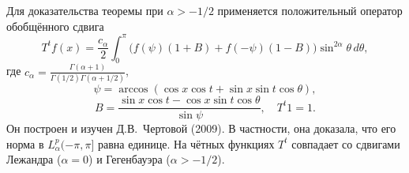 Для доказательства теоремы при $\alpha>-1/2$ применяется положительный оператор
обобщённого сдвига
\[
T^{t}f(x)=\frac{c_{\alpha}}{2}\int_{0}^{\pi}\bigl(f(\psi)(1+B)+
f(-\psi)(1-B)\bigr)\sin^{2\alpha}\theta\,d\theta,
\]
где $c_{\alpha}=\frac{\Gamma(\alpha+1)}{\Gamma(1/2)\Gamma(\alpha+1/2)}$,
\[
\psi=\arccos (\cos x\cos t+\sin x\sin t\cos \theta),
\]
\[
B=\frac{\sin x\cos t-\cos x\sin t\cos \theta}{\sin \psi},\quad T^{t}1=1.
\]
Он построен и изучен Д.В.~Чертовой (2009). В частности, она доказала, что его
норма в $L_{\alpha}^{p}(-\pi,\pi]$ равна единице. На чётных функциях $T^{t}$
совпадает со сдвигами Лежандра ($\alpha=0$) и Гегенбауэра ($\alpha>-1/2$).





